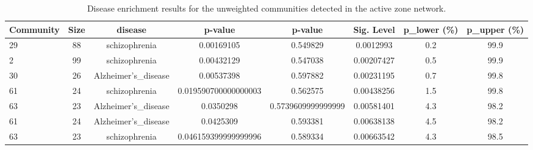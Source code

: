 \begin{table}
    \centering
    \begin{tabular}{l c c c c c c c}
        \small
        Community & Size & disease & p-value & {p-value} & Sig. Level & p_lower (\%) & p_upper (\%) \\
        \hline
        29 & 88 & schizophrenia & 0.00169105 & 0.549829 & 0.0012993 & 0.2 & 99.9 \\
        2 & 99 & schizophrenia & 0.00432129 & 0.547038 & 0.00207427 & 0.5 & 99.9 \\
        30 & 26 & Alzheimer's_disease & 0.00537398 & 0.597882 & 0.00231195 & 0.7 & 99.8 \\
        61 & 24 & schizophrenia & 0.019590700000000003 & 0.562575 & 0.00438256 & 1.5 & 99.8 \\
        63 & 23 & Alzheimer's_disease & 0.0350298 & 0.5739609999999999 & 0.00581401 & 4.3 & 98.2 \\
        61 & 24 & Alzheimer's_disease & 0.0425309 & 0.593381 & 0.00638138 & 4.5 & 98.2 \\
        63 & 23 & schizophrenia & 0.046159399999999996 & 0.589334 & 0.00663542 & 4.3 & 98.5 \\
    \end{tabular}
    \caption{Disease enrichment results for the unweighted communities detected in the active zone network.}
    \label{tab:uwdisease}
\end{table}

%
%
%
